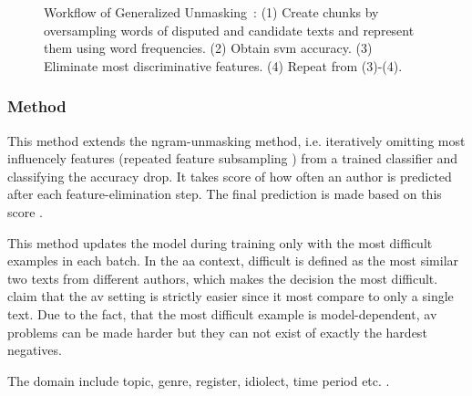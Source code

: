     






\begin{figure}[htbp]
    \centering
    
    \caption{Workflow of Generalized Unmasking~\citep{bevendorff_generalizing_2019}: (1) Create chunks by oversampling words of disputed and candidate texts and represent them using word frequencies. (2) Obtain \ac{svm} accuracy. (3) Eliminate most discriminative features. (4) Repeat from (3)-(4).}
    \label{fig:unmasking}
\end{figure}



  
\subsubsection{\imp{} Method}
\label{sec:impostor_method_theory}


\begin{definition}
    This method extends the ngram-unmasking method, i.e. iteratively omitting most influencely features (repeated feature subsampling \citep{koppel_determining_2014})
    from a trained classifier and classifying the accuracy drop.
    It takes score of how often an author is predicted after each feature-elimination step.
    The final prediction is made based on this score \citep{tyo_state_2022}.
\end{definition}


\begin{definition}
    This method updates the model during training only with the most difficult examples in each batch.
    In the \ac{aa} context, difficult is defined as the most similar two texts from different authors, 
    which makes the decision the most difficult.
    \citet{tyo_state_2022} claim that the \ac{av} setting is strictly easier since 
    it most compare to only a single text.
    Due to the fact, that the most difficult example is model-dependent, \ac{av} problems can be made harder 
    but they can not exist of exactly the hardest negatives.
\end{definition}


\begin{definition}
    [Domain]
    The domain include topic, genre, register, idiolect, time period etc. \citep{bischoff_importance_2020}.
\end{definition}
  
